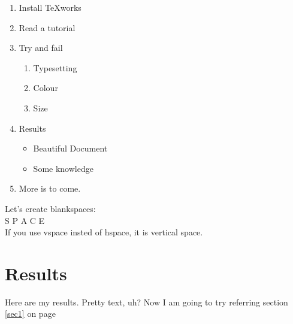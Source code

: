 \documentclass[a4paper,12pt]{article}
\begin{document}
		\begin{enumerate}
			\item Install TeXworks
			\item Read a tutorial
			\item Try and fail
			\begin{enumerate}
				\item Typesetting
				\item Colour
				\item Size
			\end{enumerate}
			\item Results
			\begin{itemize}
				\item Beautiful Document
				\item Some knowledge
			\end{itemize}
			\item More is to come.
		\end{enumerate}

		Let's create blankspaces: \\
		S \hspace{10pt} P \hspace{40pt} A \hspace{60pt} C \hspace{80pt} E \\
		If you use vspace insted of hspace, it is vertical space.
		
	
	\section{Results}
	Here are my results. Pretty text, uh?
	Now I am going to try referring section \ref{sec1} on page \pageref{sec1}
\end{document}
